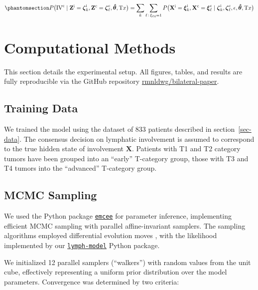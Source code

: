 \documentclass[
  sn-mathphys-num,
]{sn-jnl}
\begin{document}
\begin{equation}\phantomsection\label{eq-marg-over-posterior}{
P \big( \text{IV}^\text{c} \mid \mathbf{Z}^\text{i}=\boldsymbol{\zeta}^\text{i}_k, \mathbf{Z}^\text{c}=\boldsymbol{\zeta}^\text{c}_\ell, \boldsymbol{\hat{\theta}}, \text{T}x \big) = \sum_k \sum_{\ell \, : \, \xi_{\ell 4}=1} P \big( \mathbf{X}^\text{i} = \boldsymbol{\xi}^\text{i}_k, \mathbf{X}^\text{c} = \boldsymbol{\xi}^\text{c}_\ell \mid \boldsymbol{\zeta}^\text{i}_k, \boldsymbol{\zeta}^\text{c}_\ell, \epsilon, \boldsymbol{\hat{\theta}}, \text{T}x \big)
}\end{equation}

\section{Computational Methods}\label{sec-methods}

This section details the experimental setup. All figures, tables, and
results are fully reproducible via the GitHub repository
\href{https://github.com/rmnldwg/bilateral-paper}{rmnldwg/bilateral-paper}.

\subsection{Training Data}\label{sec-training-data}

We trained the model using the dataset of 833 patients described in
section~\ref{sec-data}. The consensus decision on lymphatic involvement
is assumed to correspond to the true hidden state of involvement
\(\mathbf{X}\). Patients with T1 and T2 category tumors have been
grouped into an ``early'' T-category group, those with T3 and T4 tumors
into the ``advanced'' T-category group.

\subsection{MCMC Sampling}\label{sec-sampling}

We used the Python package
\href{https://emcee.readthedocs.io/en/stable/}{\texttt{emcee}}
\citep{foreman-mackey_emcee_2013} for parameter inference, implementing
efficient MCMC sampling with parallel affine-invariant samplers. The
sampling algorithms employed differential evolution moves
\citep{terbraak_differential_2008, nelson_run_2013}, with the likelihood
implemented by our
\href{https://lymph-model.readthedocs.io/en/stable/}{\texttt{lymph-model}}
Python package.

We initialized 12 parallel samplers (``walkers'') with random values
from the unit cube, effectively representing a uniform prior
distribution over the model parameters. Convergence was determined by
two criteria:
\end{document}
